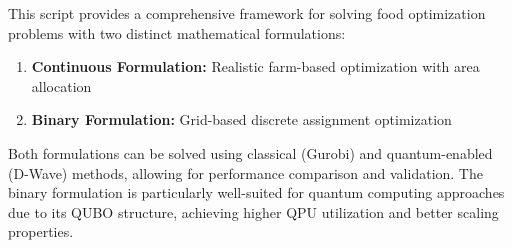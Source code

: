 \documentclass{article}
\begin{document}
This script provides a comprehensive framework for solving food optimization problems with two distinct mathematical formulations:

\begin{enumerate}
    \item \textbf{Continuous Formulation:} Realistic farm-based optimization with area allocation
    \item \textbf{Binary Formulation:} Grid-based discrete assignment optimization
\end{enumerate}

Both formulations can be solved using classical (Gurobi) and quantum-enabled (D-Wave) methods, allowing for performance comparison and validation. The binary formulation is particularly well-suited for quantum computing approaches due to its QUBO structure, achieving higher QPU utilization and better scaling properties.
\end{document}
